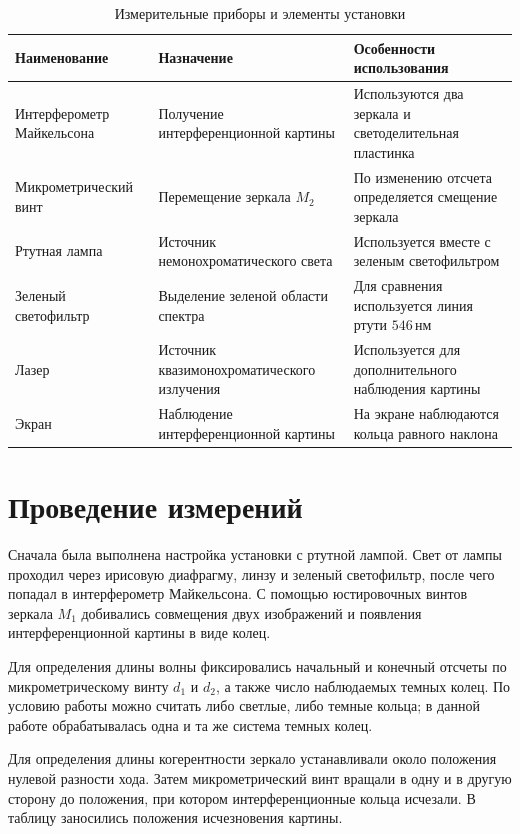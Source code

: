 \documentclass[12pt,a4paper]{article}
\newcommand{\nm}{\ensuremath{\,\text{нм}}}
\begin{document}
\begin{table}[H]
\centering
\caption{Измерительные приборы и элементы установки}
\begin{tabularx}{\textwidth}{>{\raggedright\arraybackslash}X>{\raggedright\arraybackslash}X>{\raggedright\arraybackslash}X}
\toprule
Наименование & Назначение & Особенности использования \\
\midrule
Интерферометр Майкельсона & Получение интерференционной картины & Используются два зеркала и светоделительная пластинка \\
Микрометрический винт & Перемещение зеркала $M_2$ & По изменению отсчета определяется смещение зеркала \\
Ртутная лампа & Источник немонохроматического света & Используется вместе с зеленым светофильтром \\
Зеленый светофильтр & Выделение зеленой области спектра & Для сравнения используется линия ртути $546\nm$ \\
Лазер & Источник квазимонохроматического излучения & Используется для дополнительного наблюдения картины \\
Экран & Наблюдение интерференционной картины & На экране наблюдаются кольца равного наклона \\
\bottomrule
\end{tabularx}
\end{table}

\section{Проведение измерений}

Сначала была выполнена настройка установки с ртутной лампой. Свет от лампы проходил через ирисовую диафрагму, линзу и зеленый светофильтр, после чего попадал в интерферометр Майкельсона. С помощью юстировочных винтов зеркала $M_1$ добивались совмещения двух изображений и появления интерференционной картины в виде колец.

Для определения длины волны фиксировались начальный и конечный отсчеты по микрометрическому винту $d_1$ и $d_2$, а также число наблюдаемых темных колец. По условию работы можно считать либо светлые, либо темные кольца; в данной работе обрабатывалась одна и та же система темных колец.

Для определения длины когерентности зеркало устанавливали около положения нулевой разности хода. Затем микрометрический винт вращали в одну и в другую сторону до положения, при котором интерференционные кольца исчезали. В таблицу заносились положения исчезновения картины.
\end{document}
